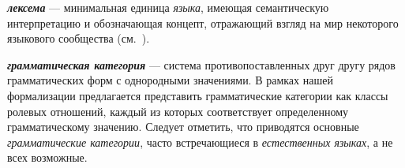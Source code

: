 \textbf{\textit{лексема}} --- минимальная единица \textit{языка}, имеющая семантическую интерпретацию и обозначающая концепт, отражающий взгляд на мир некоторого языкового сообщества (см.~).

\textbf{\textit{грамматическая категория}} --- система противопоставленных друг другу рядов грамматических форм с однородными значениями.
В рамках нашей формализации предлагается представить грамматические категории как классы ролевых отношений, каждый из которых соответствует определенному грамматическому значению.
Следует отметить, что приводятся основные \textit{грамматические категории}, часто встречающиеся в \textit{естественных языках}, а не всех возможные.

\begin{SCn}

    \begin{scnindent}
    \end{scnindent}
    \begin{scnindent}
    \end{scnindent}
    \begin{scnindent}
    \end{scnindent}
    \begin{scnindent}

\end{scnindent}
\end{SCn}
